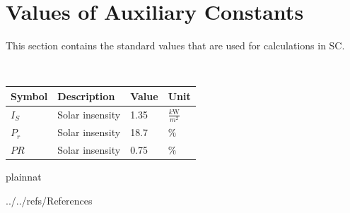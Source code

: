 \documentclass[12pt]{article}
\begin{document}

\section{Values of Auxiliary Constants}\label{sec_VAC}

This section contains the standard values that are used for calculations in SC.


~\newline

\renewcommand{\arraystretch}{1.2}

  \noindent \begin{tabular}{l l l l} 
    \toprule		
    \textbf{Symbol} & \textbf{Description} & \textbf{Value}& \textbf{Unit}\\
    \midrule 
    $I_{S}$ & Solar insensity &1.35 & $\frac{k\si\watt}{m^2}$ \\
 	 $P_r$ & Solar insensity &18.7 & $\%$ \\
	 $PR$ & Solar insensity &0.75 & $\%$ \\
    \bottomrule
  \end{tabular}




 {plainnat}


 {../../refs/References}


\newpage

\iffalse\noindent {}
\end{document}

